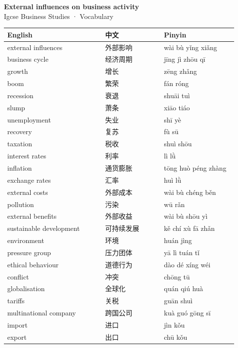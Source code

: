 \documentclass[11pt]{article}
\begin{document}
\begin{center}
  {\LARGE\bfseries External influences on business activity}\\[0.35em]
  {\large Igcse Business Studies · Vocabulary}
\end{center}
\vspace{0.6em}

\begin{longtable}{@{}p{0.40\linewidth}p{0.24\linewidth}p{0.30\linewidth}@{}}
\toprule
\textbf{English} & \textbf{中文} & \textbf{Pinyin} \\
\midrule
\endhead
\bottomrule
\endlastfoot
external influences & 外部影响 & wài bù yǐng xiǎng \\
business cycle & 经济周期 & jīng jì zhōu qī \\
growth & 增长 & zēng zhǎng \\
boom & 繁荣 & fán róng \\
recession & 衰退 & shuāi tuì \\
slump & 萧条 & xiāo tiáo \\
unemployment & 失业 & shī yè \\
recovery & 复苏 & fù sū \\
taxation & 税收 & shuì shōu \\
interest rates & 利率 & lì lǜ \\
inflation & 通货膨胀 & tōng huò péng zhàng \\
exchange rates & 汇率 & huì lǜ \\
external costs & 外部成本 & wài bù chéng běn \\
pollution & 污染 & wū rǎn \\
external benefits & 外部收益 & wài bù shōu yì \\
sustainable development & 可持续发展 & kě chí xù fā zhǎn \\
environment & 环境 & huán jìng \\
pressure group & 压力团体 & yā lì tuán tǐ \\
ethical behaviour & 道德行为 & dào dé xíng wéi \\
conflict & 冲突 & chōng tū \\
globalisation & 全球化 & quán qiú huà \\
tariffs & 关税 & guān shuì \\
multinational company & 跨国公司 & kuà guó gōng sī \\
import & 进口 & jìn kǒu \\
export & 出口 & chū kǒu \\
\end{longtable}
\end{document}
